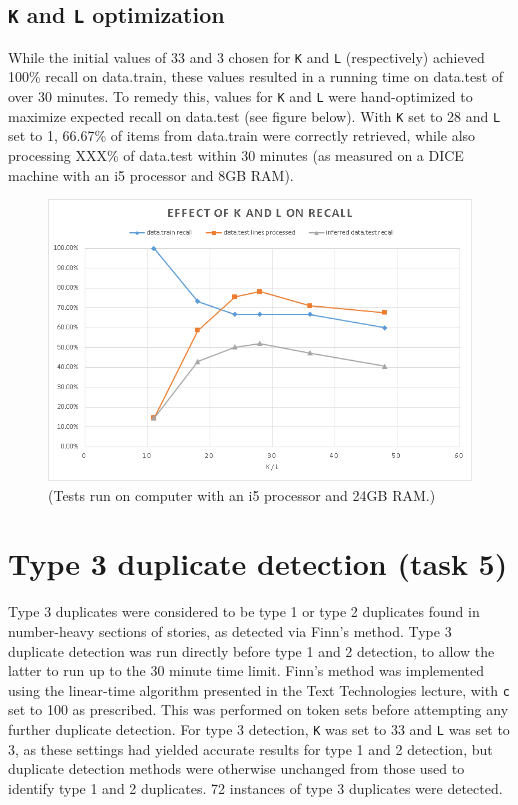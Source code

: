 \documentclass{article}
\begin{document}
\subsection{\texttt{K} and \texttt{L} optimization}
While the initial values of 33 and 3 chosen for \texttt{K} and \texttt{L} (respectively) achieved 100\% recall on data.train, these values resulted in a running time on data.test of over 30 minutes. To remedy this, values for \texttt{K} and \texttt{L} were hand-optimized to maximize expected recall on data.test (see figure below). With \texttt{K} set to 28 and \texttt{L} set to 1, 66.67\% of items from data.train were correctly retrieved, while also processing XXX\% of data.test within 30 minutes (as measured on a DICE machine with an i5 processor and 8GB RAM).
\begin{figure}[ht!]
\centering
\includegraphics[width=165mm]{graph.png}
(Tests run on computer with an i5 processor and 24GB RAM.)
\end{figure}

\section{Type 3 duplicate detection (task 5)}
Type 3 duplicates were considered to be type 1 or type 2 duplicates found in number-heavy sections of stories, as detected via Finn's method. Type 3 duplicate detection was run directly before type 1 and 2 detection, to allow the latter to run up to the 30 minute time limit. Finn's method was implemented using the linear-time algorithm presented in the Text Technologies lecture, with \texttt{c} set to 100 as prescribed. This was performed on token sets before attempting any further duplicate detection. For type 3 detection, \texttt{K} was set to 33 and \texttt{L} was set to 3, as these settings had yielded accurate results for type 1 and 2 detection, but duplicate detection methods were otherwise unchanged from those used to identify type 1 and 2 duplicates. 72 instances of type 3 duplicates were detected.
\end{document}
